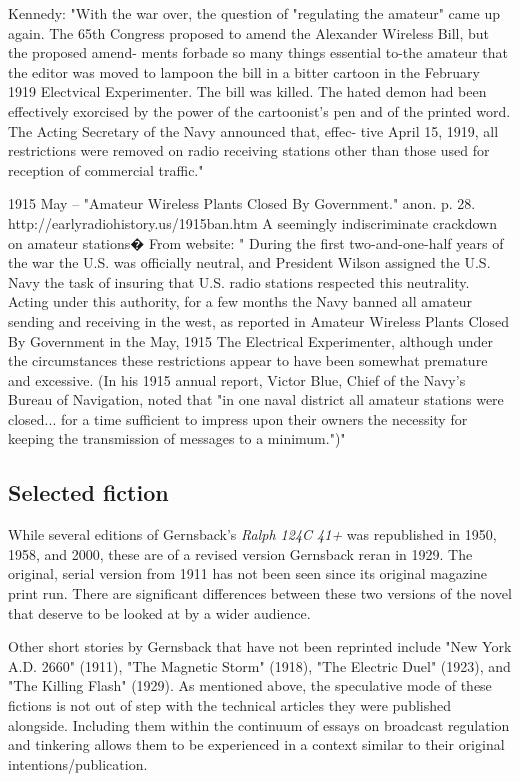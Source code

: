 \documentclass{article}
\begin{document}
Kennedy:  "With the war over, the question of "regulating the amateur" came up again. The 65th Congress proposed to amend the Alexander Wireless Bill, but the proposed amend- ments forbade so many things essential to-the amateur that the editor was moved to lampoon the bill in a bitter cartoon in the February 1919 Electvical Experimenter. The bill was killed. The hated demon had been effectively exorcised by the power of the cartoonist's pen and of the printed word. The Acting Secretary of the Navy announced that, effec- tive April 15, 1919, all restrictions were removed on radio receiving stations other than those used for reception of commercial traffic."

1915 May -- "Amateur Wireless Plants Closed By Government."  anon.  p. 28.  http://earlyradiohistory.us/1915ban.htm  A seemingly indiscriminate crackdown on amateur stations�  From website:  " During the first two-and-one-half years of the war the U.S. was officially neutral, and President Wilson assigned the U.S. Navy the task of insuring that U.S. radio stations respected this neutrality. Acting under this authority, for a few months the Navy banned all amateur sending and receiving in the west, as reported in Amateur Wireless Plants Closed By Government in the May, 1915 The Electrical Experimenter, although under the circumstances these restrictions appear to have been somewhat premature and excessive. (In his 1915 annual report, Victor Blue, Chief of the Navy's Bureau of Navigation, noted that "in one naval district all amateur stations were closed... for a time sufficient to impress upon their owners the necessity for keeping the transmission of messages to a minimum.")"

\subsection{Selected fiction}

While several editions of Gernsback's \textit{Ralph 124C 41+} was republished in 1950, 1958, and 2000, these are of a revised version Gernsback reran in 1929.  The original, serial version from 1911 has not been seen since its original magazine print run.  There are significant differences between these two versions of the novel that deserve to be looked at by a wider audience.

Other short stories by Gernsback that have not been reprinted include "New York A.D. 2660" (1911), "The Magnetic Storm" (1918), "The Electric Duel" (1923), and "The Killing Flash" (1929).  As mentioned above, the speculative mode of these fictions is not out of step with the technical articles they were published alongside.  Including them within the continuum of essays on broadcast regulation and tinkering allows them to be experienced in a context similar to their original intentions/publication.
\end{document}
